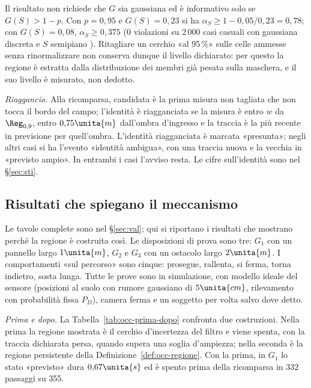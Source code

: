 Il risultato non richiede che $G$ sia gaussiana ed è informativo solo se $G(S)>1-p$. Con $p=0{,}95$ e $G(S)=0{,}23$ si ha $\alpha_S\ge1-0{,}05/0{,}23=0{,}78$; con $G(S)=0{,}08$, $\alpha_S\ge0{,}375$ (0 violazioni su 2\,000 casi casuali con gaussiana discreta e $S$ semipiano ). Ritagliare un cerchio «al 95\,\%» sulle celle ammesse senza rinormalizzare non conserva dunque il livello dichiarato: per questo la regione è estratta dalla distribuzione dei membri già pesata sulla maschera, e il suo livello è misurato, non dedotto.

\emph{Riaggancio.} Alla ricomparsa, candidata è la prima misura non tagliata che non tocca il bordo del campo; l'identità è riagganciata se la misura è entro $w$ da $\Reg_{0,9}$, entro $0{,}75\unita{m}$ dall'ombra d'ingresso e la traccia è la più recente in previsione per quell'ombra. L'identità riagganciata è marcata «presunta»; negli altri casi si ha l'evento «identità ambigua», con una traccia nuova e la vecchia in «previsto ampio». In entrambi i casi l'avviso resta. Le cifre sull'identità sono nel \S\ref{sec:sti}.

\subsection{Risultati che spiegano il meccanismo}\label{sec:occ-risultati}

Le tavole complete sono nel \S\ref{sec:val}; qui si riportano i risultati che mostrano perché la regione è costruita così. Le disposizioni di prova sono tre: $G_1$ con un pannello largo $1\unita{m}$, $G_2$ e $G_3$ con un ostacolo largo $2\unita{m}$. I comportamenti «sul percorso» sono cinque: prosegue, rallenta, si ferma, torna indietro, sosta lunga. Tutte le prove sono in simulazione, con modello ideale del sensore (posizioni al suolo con rumore gaussiano di $5\unita{cm}$, rilevamento con probabilità fissa $P_D$), camera ferma e un soggetto per volta salvo dove detto.

\emph{Prima e dopo.} La Tabella~\ref{tab:occ-prima-dopo} confronta due costruzioni. Nella prima la regione mostrata è il cerchio d'incertezza del filtro e viene spenta, con la traccia dichiarata persa, quando supera una soglia d'ampiezza; nella seconda è la regione persistente della Definizione~\ref{def:occ-regione}. Con la prima, in $G_1$ lo stato «previsto» dura $0{,}67\unita{s}$ ed è spento prima della ricomparsa in 332 passaggi su 355.

